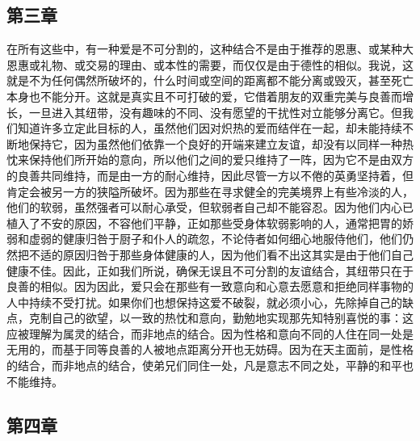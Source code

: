 
\subsection{第三章}

\par

在所有这些中，有一种爱是不可分割的，这种结合不是由于推荐的恩惠、或某种大恩惠或礼物、或交易的理由、或本性的需要，而仅仅是由于德性的相似。我说，这就是不为任何偶然所破坏的，什么时间或空间的距离都不能分离或毁灭，甚至死亡本身也不能分开。这就是真实且不可打破的爱，它借着朋友的双重完美与良善而增长，一旦进入其纽带，没有趣味的不同、没有愿望的干扰性对立能够分离它。但我们知道许多立定此目标的人，虽然他们因对炽热的爱而结伴在一起，却未能持续不断地保持它，因为虽然他们依靠一个良好的开端来建立友谊，却没有以同样一种热忱来保持他们所开始的意向，所以他们之间的爱只维持了一阵，因为它不是由双方的良善共同维持，而是由一方的耐心维持，因此尽管一方以不倦的英勇坚持着，但肯定会被另一方的狭隘所破坏。因为那些在寻求健全的完美境界上有些冷淡的人，他们的软弱，虽然强者可以耐心承受，但软弱者自己却不能容忍。因为他们内心已植入了不安的原因，不容他们平静，正如那些受身体软弱影响的人，通常把胃的娇弱和虚弱的健康归咎于厨子和仆人的疏忽，不论侍者如何细心地服侍他们，他们仍然把不适的原因归咎于那些身体健康的人，因为他们看不出这其实是由于他们自己健康不佳。因此，正如我们所说，确保无误且不可分割的友谊结合，其纽带只在于良善的相似。因为因此，爱只会在那些有一致意向和心意去愿意和拒绝同样事物的人中持续不受打扰。如果你们也想保持这爱不破裂，就必须小心，先除掉自己的缺点，克制自己的欲望，以一致的热忱和意向，勤勉地实现那先知特别喜悦的事：这应被理解为属灵的结合，而非地点的结合。因为性格和意向不同的人住在同一处是无用的，而基于同等良善的人被地点距离分开也无妨碍。因为在天主面前，是性格的结合，而非地点的结合，使弟兄们同住一处，凡是意志不同之处，平静的和平也不能维持。\par


\subsection{第四章}

\par

